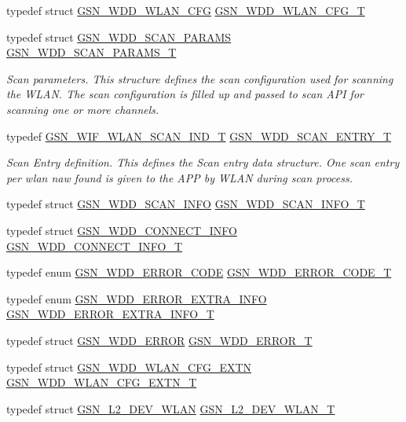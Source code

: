 \begin{DoxyCompactItemize}
\item 
typedef struct \hyperlink{a00302}{GSN\_\-WDD\_\-WLAN\_\-CFG} \hyperlink{a00603_a622f424d99b2a980a82684099bb1092c}{GSN\_\-WDD\_\-WLAN\_\-CFG\_\-T}
\item 
typedef struct \hyperlink{a00286}{GSN\_\-WDD\_\-SCAN\_\-PARAMS} \hyperlink{a00677_ga5df05c7cc3d6a8db66ec41eb7c9548e9}{GSN\_\-WDD\_\-SCAN\_\-PARAMS\_\-T}
\begin{DoxyCompactList}\small\item\em Scan parameters. This structure defines the scan configuration used for scanning the WLAN. The scan configuration is filled up and passed to scan API for scanning one or more channels. \end{DoxyCompactList}\item 
typedef \hyperlink{a00400}{GSN\_\-WIF\_\-WLAN\_\-SCAN\_\-IND\_\-T} \hyperlink{a00677_gaca7e9b8176b0ff06a2cb24c84be888ed}{GSN\_\-WDD\_\-SCAN\_\-ENTRY\_\-T}
\begin{DoxyCompactList}\small\item\em Scan Entry definition. This defines the Scan entry data structure. One scan entry per wlan naw found is given to the APP by WLAN during scan process. \end{DoxyCompactList}\item 
typedef struct \hyperlink{a00285}{GSN\_\-WDD\_\-SCAN\_\-INFO} \hyperlink{a00603_abe2c6b1527f6a2e6bc61ebacfd6f1391}{GSN\_\-WDD\_\-SCAN\_\-INFO\_\-T}
\item 
typedef struct \hyperlink{a00273}{GSN\_\-WDD\_\-CONNECT\_\-INFO} \hyperlink{a00603_a99522d8b9d2419985efa523af3c9c00d}{GSN\_\-WDD\_\-CONNECT\_\-INFO\_\-T}
\item 
typedef enum \hyperlink{a00603_ab5fdb01131bac4294899f4261109f072}{GSN\_\-WDD\_\-ERROR\_\-CODE} \hyperlink{a00603_a319a2113768d730bfaa5ab1c954f49c1}{GSN\_\-WDD\_\-ERROR\_\-CODE\_\-T}
\item 
typedef enum \hyperlink{a00603_a25ca4f0a075752eaf99103b405458b83}{GSN\_\-WDD\_\-ERROR\_\-EXTRA\_\-INFO} \hyperlink{a00603_af9a6675c005f80382367ca85c5280ad1}{GSN\_\-WDD\_\-ERROR\_\-EXTRA\_\-INFO\_\-T}
\item 
typedef struct \hyperlink{a00274}{GSN\_\-WDD\_\-ERROR} \hyperlink{a00603_aa95a91b24c682d5580c32e1588d9405e}{GSN\_\-WDD\_\-ERROR\_\-T}
\item 
typedef struct \hyperlink{a00303}{GSN\_\-WDD\_\-WLAN\_\-CFG\_\-EXTN} \hyperlink{a00603_ab591a0b1dc86f93d62c54f486296eed4}{GSN\_\-WDD\_\-WLAN\_\-CFG\_\-EXTN\_\-T}
\item 
typedef struct \hyperlink{a00108}{GSN\_\-L2\_\-DEV\_\-WLAN} \hyperlink{a00603_aa56847c4ab1a6ceb37bdb04c5bcb1d0c}{GSN\_\-L2\_\-DEV\_\-WLAN\_\-T}

\end{DoxyCompactItemize}
